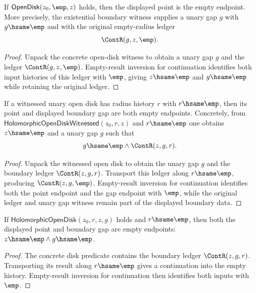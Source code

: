 \begin{theorem}
\label{thm:open-disk-empty-radius-boundary}
If $\mathsf{OpenDisk}(z_0,\emp,z)$ holds, then the displayed point is the
empty endpoint. More precisely, the existential boundary witness supplies a
unary gap $g$ with $g\hsame\emp$ and with the original empty-radius ledger
$$
\ContR(g,z,\emp).
$$
\end{theorem}
\begin{proof}
Unpack the concrete open-disk witness to obtain a unary gap $g$ and the ledger
$\ContR(g,z,\emp)$. Empty-result inversion for continuation identifies both
input histories of this ledger with $\emp$, giving $z\hsame\emp$ and
$g\hsame\emp$ while retaining the original ledger.
\end{proof}

\begin{theorem}
\label{thm:holo-open-disk-witnessed-empty-radius-boundary}
If a witnessed unary open disk has radius history $r$ with $r\hsame\emp$, then
its point and displayed boundary gap are both empty endpoints. Concretely,
from $\mathsf{HolomorphicOpenDiskWitnessed}(z_0,r,z)$ and $r\hsame\emp$ one
obtains $z\hsame\emp$ and a unary gap $g$ such that
$$
g\hsame\emp\land\ContR(z,g,r).
$$
\end{theorem}
\begin{proof}
Unpack the witnessed open disk to obtain the unary gap $g$ and the boundary
ledger $\ContR(z,g,r)$. Transport this ledger along $r\hsame\emp$, producing
$\ContR(z,g,\emp)$. Empty-result inversion for continuation identifies both
the point endpoint and the gap endpoint with $\emp$, while the original ledger
and unary gap witness remain part of the displayed boundary data.
\end{proof}

\begin{theorem}
\label{thm:holomorphic-open-disk-empty-radius-boundary}
If \(\mathsf{HolomorphicOpenDisk}(z_0,r,z,g)\) holds and \(r\hsame\emp\),
then both the displayed point and boundary gap are empty endpoints:
\(z\hsame\emp\land g\hsame\emp\).
\end{theorem}
\begin{proof}
The concrete disk predicate contains the boundary ledger \(\ContR(z,g,r)\).
Transporting its result along \(r\hsame\emp\) gives a continuation into the
empty history. Empty-result inversion for continuation then identifies both
inputs with \(\emp\).
\end{proof}
